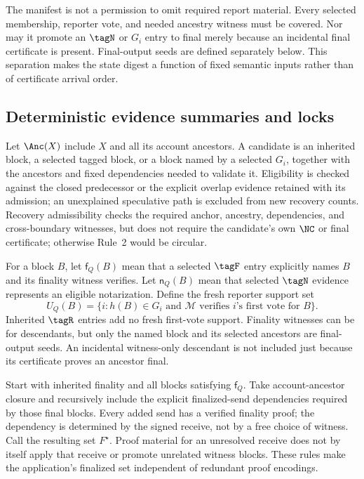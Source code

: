 The manifest is not a permission to omit required report material. Every selected membership, reporter vote, and needed ancestry witness must be covered. Nor may it promote an $\tagN$ or $G_i$ entry to final merely because an incidental final certificate is present. Final-output seeds are defined separately below. This separation makes the state digest a function of fixed semantic inputs rather than of certificate arrival order.

\subsection{Deterministic evidence summaries and locks}
\label{sec:build}
Let $\Anc(X)$ include $X$ and all its account ancestors. A candidate is an inherited block, a selected tagged block, or a block named by a selected $G_i$, together with the ancestors and fixed dependencies needed to validate it. Eligibility is checked against the closed predecessor or the explicit overlap evidence retained with its admission; an unexplained speculative path is excluded from new recovery counts. Recovery admissibility checks the required anchor, ancestry, dependencies, and cross-boundary witnesses, but does not require the candidate's own $\NC$ or final certificate; otherwise Rule~2 would be circular.

For a block $B$, let $\mathsf{f}_Q(B)$ mean that a selected $\tagF$ entry explicitly names $B$ and its finality witness verifies. Let $\mathsf{n}_Q(B)$ mean that selected $\tagN$ evidence represents an eligible notarization. Define the fresh reporter support set
\[
U_Q(B)=\{i:h(B)\in G_i\text{ and $\mathcal M$ verifies $i$'s first vote for $B$}\}.
\]
Inherited $\tagR$ entries add no fresh first-vote support. Finality witnesses can be for descendants, but only the named block and its selected ancestors are final-output seeds. An incidental witness-only descendant is not included just because its certificate proves an ancestor final.

Start with inherited finality and all blocks satisfying $\mathsf{f}_Q$. Take account-ancestor closure and recursively include the explicit finalized-send dependencies required by those final blocks. Every added send has a verified finality proof; the dependency is determined by the signed receive, not by a free choice of witness. Call the resulting set $F^\star$. Proof material for an unresolved receive does not by itself apply that receive or promote unrelated witness blocks. These rules make the application's finalized set independent of redundant proof encodings.


